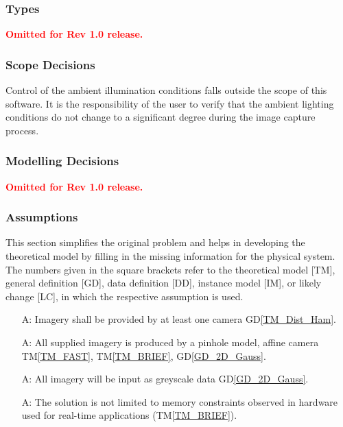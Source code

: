 \documentclass[12pt]{article}
\newcommand{\dref}[1]{GD\ref{#1}}
\newcommand{\tref}[1]{TM\ref{#1}}
\newcounter{assumpnum} %
\begin{document}
\subsubsection{Types}
\textcolor{red}{\textbf{Omitted for Rev 1.0 release.}}

\subsubsection{Scope Decisions}
Control of the ambient illumination conditions falls outside the scope of this software.
It is the responsibility of the user to verify that the ambient lighting conditions do 
not change to a significant degree during the image capture process.


\subsubsection{Modelling Decisions}
\textcolor{red}{\textbf{Omitted for Rev 1.0 release.}}

\subsubsection{Assumptions} \label{sec_assumpt}
This section simplifies the original problem and helps in developing the
theoretical model by filling in the missing information for the physical system.
The numbers given in the square brackets refer to the theoretical model [TM],
general definition [GD], data definition [DD], instance model [IM], or likely
change [LC], in which the respective assumption is used.

\begin{itemize}
\item[A\refstepcounter{assumpnum}\theassumpnum \label{A_min_num_cameras}:]
Imagery shall be provided by at least one camera \dref{TM_Dist_Ham}.

\item[A\refstepcounter{assumpnum}\theassumpnum \label{A_camera_model}:]
All supplied imagery is produced by a pinhole model, affine camera 
\tref{TM_FAST}, \tref{TM_BRIEF}, \dref{GD_2D_Gauss}.

\item[A\refstepcounter{assumpnum}\theassumpnum \label{A_greyscale}:]
All imagery will be input as greyscale data \dref{GD_2D_Gauss}.

\item[A\refstepcounter{assumpnum}\theassumpnum \label{A_RT_Memory}:]
The solution is not limited to memory constraints observed in hardware used for real-time 
applications (\tref{TM_BRIEF}).

\end{itemize}
\end{document}
